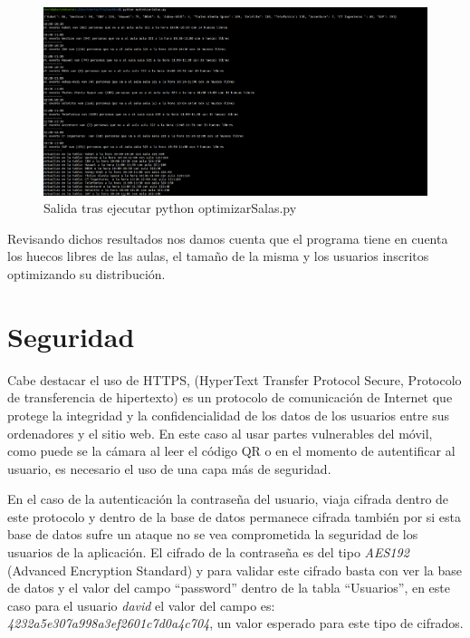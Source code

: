 \documentclass[a4paper, 12pt]{book}
\begin{document}
 \begin{figure}
  	\centering
  	\includegraphics[width=16cm, keepaspectratio]{img/terminalOptimizar.png}
  	\caption{Salida tras ejecutar python optimizarSalas.py}\label{fig:terminalOptimizar}
	\end{figure}
 
Revisando dichos resultados nos damos cuenta que el programa tiene en cuenta los huecos libres de las aulas, el tamaño de la misma y los usuarios inscritos optimizando su distribución.


\section{Seguridad}
Cabe destacar el uso de HTTPS, (HyperText Transfer Protocol Secure, Protocolo de transferencia de hipertexto) es un protocolo de comunicación de Internet que protege la integridad y la confidencialidad de los datos de los usuarios entre sus ordenadores y el sitio web. En este caso al usar partes vulnerables del móvil, como puede se la cámara al leer el código QR o en el momento de autentificar al usuario, es necesario el uso de una capa más de seguridad.
 
 
En el caso de la autenticación la contraseña del usuario, viaja cifrada dentro de este protocolo y dentro de la base de datos permanece cifrada también por si esta base de datos sufre un ataque no se vea comprometida la seguridad de los usuarios de la aplicación.
El cifrado de la contraseña es del tipo \textit{AES192} (Advanced Encryption Standard) y para validar este cifrado basta con ver la base de datos y el valor del campo ``password'' dentro de la tabla ``Usuarios'', en este caso para el usuario \textit{david} el valor del campo es: \textit{4232a5e307a998a3ef2601c7d0a4c704}, un valor esperado para este tipo de cifrados.



\end{document}
